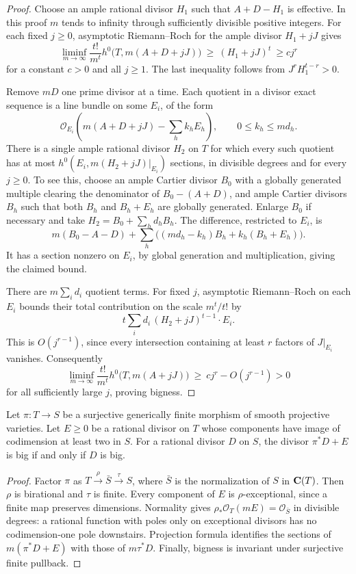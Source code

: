 \begin{proof}
Choose an ample rational divisor \(H_1\) such that \(A+D-H_1\) is
effective. In this proof \(m\) tends to infinity through sufficiently
divisible positive integers. For each fixed \(j\geq0\), asymptotic Riemann--Roch for the ample
divisor \(H_1+jJ\) gives
\[
 \liminf_{m\to\infty}
 \frac{t!}{m^t}h^0\bigl(T,m(A+D+jJ)\bigr)
 \ \geq\ (H_1+jJ)^t\ \geq c j^r
\]
for a constant \(c>0\) and all \(j\geq1\).
The last inequality follows from \(J^rH_1^{t-r}>0\).

Remove \(mD\) one prime divisor at a time. Each quotient in a divisor
exact sequence is a line bundle on some \(E_i\), of the form
\[
 \mathcal O_{E_i}
 \left(m(A+D+jJ)-\sum_h k_hE_h\right),
 \qquad 0\leq k_h\leq md_h.
\]
There is a single ample rational divisor \(H_2\) on \(T\) for which every
such quotient has at most
\(h^0(E_i,m(H_2+jJ)|_{E_i})\) sections, in divisible degrees and for every
\(j\geq0\). To see this, choose an ample Cartier divisor \(B_0\) with a
globally generated multiple clearing the denominator of
\(B_0-(A+D)\), and ample Cartier divisors \(B_h\) such that both \(B_h\)
and \(B_h+E_h\) are globally generated. Enlarge \(B_0\) if necessary and
take \(H_2=B_0+\sum_h d_hB_h\). The difference, restricted to \(E_i\), is
\[
 m(B_0-A-D)+
 \sum_h\bigl((md_h-k_h)B_h+k_h(B_h+E_h)\bigr).
\]
It has a section nonzero on \(E_i\), by global generation and
multiplication, giving the claimed bound.

There are \(m\sum_i d_i\) quotient terms. For fixed \(j\),
asymptotic Riemann--Roch on each \(E_i\) bounds their total contribution on
the scale \(m^t/t!\) by
\[
 t\sum_i d_i\,(H_2+jJ)^{t-1}\cdot E_i.
\]
This is \(O(j^{r-1})\), since every intersection containing at least
\(r\) factors of \(J|_{E_i}\) vanishes. Consequently
\[
 \liminf_{m\to\infty}
 \frac{t!}{m^t}h^0\bigl(T,m(A+jJ)\bigr)
 \ \geq\ c j^r-O(j^{r-1})>0
\]
for all sufficiently large \(j\), proving bigness.
\end{proof}

\begin{lemma}\label{altord:e:exceptional-pullback}
Let \(\pi:T\to S\) be a surjective generically finite morphism of smooth
projective varieties. Let \(E\geq0\) be a rational divisor on \(T\) whose
components have image of codimension at least two in \(S\). For a rational
divisor \(D\) on \(S\), the divisor \(\pi^*D+E\) is big if and only if
\(D\) is big.
\end{lemma}

\begin{proof}
Factor \(\pi\) as \(T\xrightarrow{\rho}\bar S\xrightarrow{\tau}S\),
where \(\bar S\) is the normalization of \(S\) in \(\mathbf C(T)\).
Then \(\rho\) is birational and \(\tau\) is finite. Every component of
\(E\) is \(\rho\)-exceptional, since a finite map preserves dimensions.
Normality gives
\(\rho_*\mathcal O_T(mE)=\mathcal O_{\bar S}\) in divisible degrees:
a rational function with poles only on exceptional divisors has no
codimension-one pole downstairs. Projection formula identifies the
sections of \(m(\pi^*D+E)\) with those of \(m\tau^*D\).
Finally, bigness is invariant under surjective finite pullback.
\end{proof}


